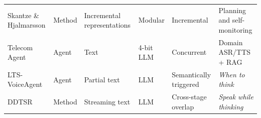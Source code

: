 \begin{table}[t]
{\begin{tabular}{l|l|l|l|l|l}
        Skantze \& Hjalmarsson \citep{DBLP:journals/csl/SkantzeH13}
        & Method
        & Incremental representations
        & Modular
        & Incremental
        & Planning and self-monitoring \\

        Telecom Agent \citep{DBLP:journals/corr/abs-2508-04721}
        & Agent
        & Text
        & 4-bit LLM
        & Concurrent
        & Domain ASR/TTS + RAG \\

        LTS-VoiceAgent \citep{DBLP:journals/corr/abs-2601-19952}
        & Agent
        & Partial text
        & LLM
        & Semantically triggered
        & \textit{When to think} \\

        DDTSR \citep{DBLP:journals/corr/abs-2602-23266}
        & Method
        & Streaming text
        & LLM
        & Cross-stage overlap
        & \textit{Speak while thinking} \\

        \bottomrule
    \end{tabular}
    }

\end{table}
